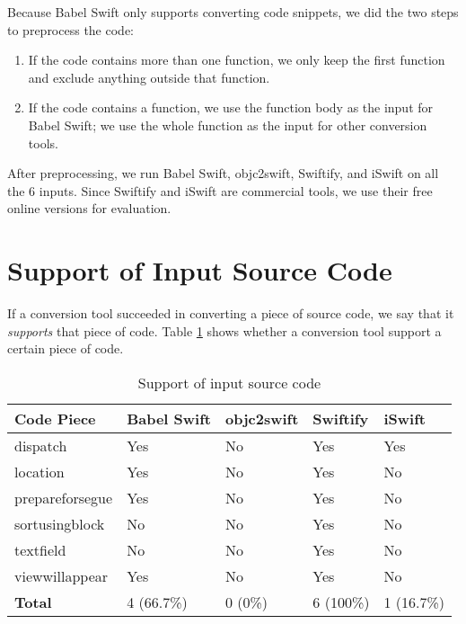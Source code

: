\documentclass{sfuthesis}
\begin{document}
Because Babel Swift only supports converting code snippets, we did the two steps to preprocess the code:

\begin{enumerate}
  \item If the code contains more than one function, we only keep the first function and exclude anything outside that function.
  \item If the code contains a function, we use the function body as the input for Babel Swift; we use the whole function as the input for other conversion tools.
\end{enumerate}

After preprocessing, we run Babel Swift, objc2swift, Swiftify, and iSwift on all the 6 inputs. Since Swiftify and iSwift are commercial tools, we use their free online versions for evaluation.  

\section{Support of Input Source Code}

If a conversion tool succeeded in converting a piece of source code, we say that it \emph{supports} that piece of code. Table \ref{table:numcodesupported} shows whether a conversion tool support a certain piece of code.

\begin{table}[H]
\begin{center}
\caption{Support of input source code}
\label{table:numcodesupported}
\begin{tabular}{|l|l|l|l|l|}
\hline
\textbf{Code Piece} & Babel Swift & objc2swift & Swiftify & iSwift \\
\hline
dispatch        & Yes & No  & Yes & Yes \\
location        & Yes & No  & Yes & No  \\
prepareforsegue & Yes & No  & Yes & No  \\
sortusingblock  & No  & No  & Yes & No  \\
textfield       & No  & No  & Yes & No  \\
viewwillappear  & Yes & No  & Yes & No  \\
\hline
\textbf{Total}  & 4 (66.7\%) & 0 (0\%) & 6 (100\%) & 1 (16.7\%) \\
\hline
\end{tabular}
\end{center}
\end{table}
\end{document}
